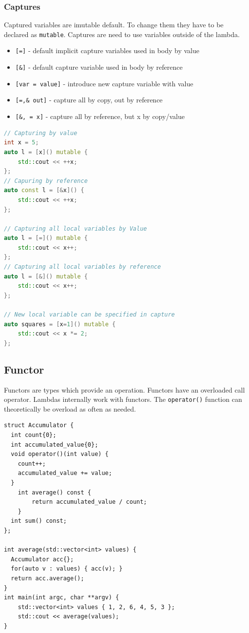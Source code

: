 \subsubsection{Captures}
Captured variables are imutable default. To change them they have to be declared as \lstinline|mutable|. Captures are need to use variables outside of the lambda.
\begin{itemize}
	\itemsep -0.5em
	\item \lstinline|[=]| - default implicit capture variables used in body by value
	\item \lstinline|[&]| - default capture variable used in body by reference
	\item \lstinline|[var = value]| - introduce new capture variable with value
	\item \lstinline|[=,& out]| - capture all by copy, out by reference 
	\item \lstinline|[&, = x]| - capture all by reference, but x by copy/value
\end{itemize}
\begin{lstlisting}[language=C++]
// Capturing by value
int x = 5;
auto l = [x]() mutable {
	std::cout << ++x;
};
// Capuring by reference
auto const l = [&x]() {
	std::cout << ++x;
};

// Capturing all local variables by Value
auto l = [=]() mutable {
	std::cout << x++;
};
// Capturing all local variables by reference
auto l = [&]() mutable {
	std::cout << x++;
};

// New local variable can be specified in capture
auto squares = [x=1]() mutable {
	std::cout << x *= 2;
};
\end{lstlisting}



\subsection{Functor}
Functors are types which provide an operation. Functors have an overloaded call operator. Lambdas internally work with functors. The \lstinline|operator()| function can theoretically be overload as often as needed.

\begin{lstlisting}
struct Accumulator {
  int count{0};
  int accumulated_value{0};
  void operator()(int value) {
    count++;
    accumulated_value += value;
  }
	int average() const {
		return accumulated_value / count;
	}
  int sum() const;
};

int average(std::vector<int> values) {
  Accumulator acc{};
  for(auto v : values) { acc(v); }
  return acc.average();
}
int main(int argc, char **argv) {
	std::vector<int> values { 1, 2, 6, 4, 5, 3 };
	std::cout << average(values);
}
\end{lstlisting}


